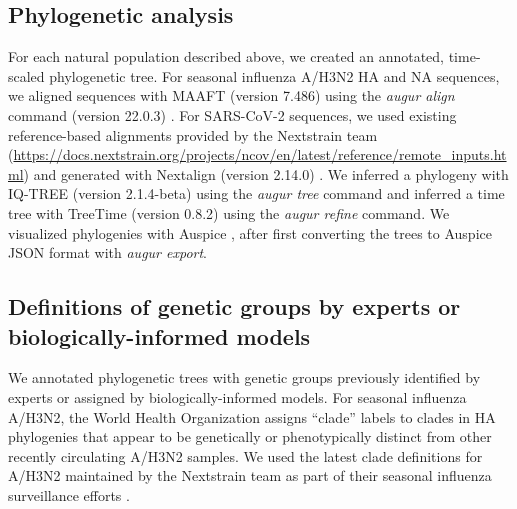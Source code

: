 \documentclass[10pt,letterpaper]{article}
\begin{document}
\subsection*{Phylogenetic analysis}

For each natural population described above, we created an annotated, time-scaled phylogenetic tree.
For seasonal influenza A/H3N2 HA and NA sequences, we aligned sequences with MAAFT (version 7.486) \cite{Katoh2002,Katoh2013} using the \textit{augur align} command (version 22.0.3) \cite{Huddleston2021}.
For SARS-CoV-2 sequences, we used existing reference-based alignments provided by the Nextstrain team (\href{https://docs.nextstrain.org/projects/ncov/en/latest/reference/remote_inputs.html#summary-of-available-genbank-open-files}{https://docs.nextstrain.org/projects/ncov/en/latest/reference/remote\_inputs.html}) and generated with Nextalign (version 2.14.0) \cite{Aksamentov2021}.
We inferred a phylogeny with IQ-TREE (version 2.1.4-beta) \cite{Nguyen2014} using the \textit{augur tree} command and inferred a time tree with TreeTime (version 0.8.2) \cite{Sagulenko2018} using the \textit{augur refine} command.
We visualized phylogenies with Auspice \cite{Hadfield2018}, after first converting the trees to Auspice JSON format with \textit{augur export}.

\subsection*{Definitions of genetic groups by experts or biologically-informed models}

We annotated phylogenetic trees with genetic groups previously identified by experts or assigned by biologically-informed models.
For seasonal influenza A/H3N2, the World Health Organization assigns ``clade'' labels to clades in HA phylogenies that appear to be genetically or phenotypically distinct from other recently circulating A/H3N2 samples.
We used the latest clade definitions for A/H3N2 maintained by the Nextstrain team as part of their seasonal influenza surveillance efforts \cite{Neher2015}.
\end{document}
